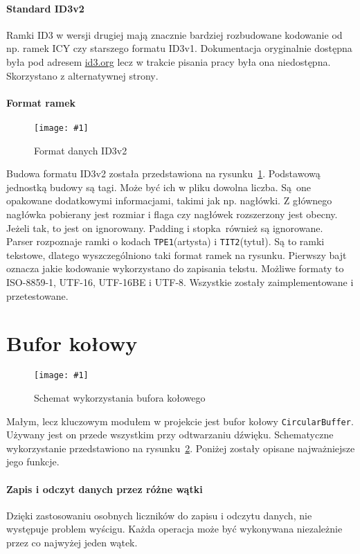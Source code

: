 \documentclass[12pt]{report}
\newcommand{\imgint}[4]{
	\begin{figure}[{#4}]
		\centering
		\texttt{[image: \#1]}
		\caption{#2}
		\label{#1}
	\end{figure}
}
\newcommand{\imgcs}[3]{\imgint{#1}{#2}{#3}{}}
\begin{document}
		\paragraph{Standard ID3v2}
		Ramki ID3 w wersji drugiej mają znacznie bardziej rozbudowane kodowanie od np. ramek ICY czy starszego formatu ID3v1. Dokumentacja oryginalnie dostępna była pod adresem \href{id3.org}{id3.org} lecz w trakcie pisania pracy była ona niedostępna. Skorzystano z alternatywnej strony\textsuperscript{\cite{id3_spec_mutagen}}.
		
		\paragraph{Format ramek}
		\imgcs{3/PicoRadio-id3}{Format danych ID3v2}{0.8}
		Budowa formatu ID3v2 została przedstawiona na rysunku~\ref{3/PicoRadio-id3}. Podstawową jednostką budowy są tagi. Może być ich w pliku dowolna liczba. Są one opakowane dodatkowymi informacjami, takimi jak np. nagłówki. Z głównego nagłówka pobierany jest rozmiar i flaga czy nagłówek rozszerzony jest obecny. Jeżeli tak, to jest on ignorowany. Padding i stopka również są ignorowane.
		$ $\\
		
		Parser rozpoznaje ramki o kodach \lstinline|TPE1|(artysta) i \lstinline|TIT2|(tytuł). Są to ramki tekstowe, dlatego wyszczególniono taki format ramek na rysunku. Pierwszy bajt oznacza jakie kodowanie wykorzystano do zapisania tekstu. Możliwe formaty to ISO-8859-1, UTF-16, UTF-16BE i UTF-8. Wszystkie zostały zaimplementowane i przetestowane.
	
	\section{Bufor kołowy}
	\imgcs{3/PicoRadio-buffer}{Schemat wykorzystania bufora kołowego}{0.8}
	Małym, lecz kluczowym modułem w projekcie jest bufor kołowy \lstinline|CircularBuffer|. Używany jest on przede wszystkim przy odtwarzaniu dźwięku. Schematyczne wykorzystanie przedstawiono na rysunku~\ref{3/PicoRadio-buffer}. Poniżej zostały opisane najważniejsze jego funkcje.
	
	\paragraph{Zapis i odczyt danych przez różne wątki}
		Dzięki zastosowaniu osobnych liczników do zapisu i odczytu danych, nie występuje problem wyścigu. Każda operacja może być wykonywana niezależnie przez co najwyżej jeden wątek.
		
\end{document}

